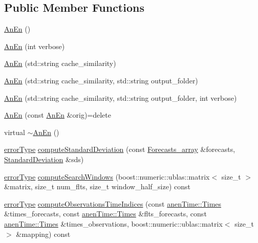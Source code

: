 \subsection*{Public Member Functions}
\begin{DoxyCompactItemize}
\item 
\mbox{\hyperlink{class_an_en_a60c12de232af95794a6194fbac06623a}{An\+En}} ()
\item 
\mbox{\hyperlink{class_an_en_a71a7c34cc125ce75e1377fd6f62988da}{An\+En}} (int verbose)
\item 
\mbox{\hyperlink{class_an_en_a02c78b9f5835a36a7a3e5c292c1d04fa}{An\+En}} (std\+::string cache\+\_\+similarity)
\item 
\mbox{\hyperlink{class_an_en_a00401d61d55408c3a8e23dbda0d7c512}{An\+En}} (std\+::string cache\+\_\+similarity, std\+::string output\+\_\+folder)
\item 
\mbox{\hyperlink{class_an_en_ab7fc3bc69d9f4639075f5700b1812b22}{An\+En}} (std\+::string cache\+\_\+similarity, std\+::string output\+\_\+folder, int verbose)
\item 
\mbox{\hyperlink{class_an_en_a97a51c40812584b01413a4426b1285a6}{An\+En}} (const \mbox{\hyperlink{class_an_en}{An\+En}} \&orig)=delete
\item 
virtual \mbox{\hyperlink{class_an_en_a18609907411058ee2c343727ab69bff4}{$\sim$\+An\+En}} ()
\item 
\mbox{\hyperlink{class_an_en_a0e256eb89d102d318a47d936b02242bf}{error\+Type}} \mbox{\hyperlink{class_an_en_a759e434ea7749b867900b783a1d02180}{compute\+Standard\+Deviation}} (const \mbox{\hyperlink{class_forecasts__array}{Forecasts\+\_\+array}} \&forecasts, \mbox{\hyperlink{class_standard_deviation}{Standard\+Deviation}} \&sds)
\item 
\mbox{\hyperlink{class_an_en_a0e256eb89d102d318a47d936b02242bf}{error\+Type}} \mbox{\hyperlink{class_an_en_ac8cfe2cbd23482c35da648a4caf402bd}{compute\+Search\+Windows}} (boost\+::numeric\+::ublas\+::matrix$<$ size\+\_\+t $>$ \&matrix, size\+\_\+t num\+\_\+flts, size\+\_\+t window\+\_\+half\+\_\+size) const
\item 
\mbox{\hyperlink{class_an_en_a0e256eb89d102d318a47d936b02242bf}{error\+Type}} \mbox{\hyperlink{class_an_en_a3aaabacd299648521c90d661dcbba300}{compute\+Observations\+Time\+Indices}} (const \mbox{\hyperlink{classanen_time_1_1_times}{anen\+Time\+::\+Times}} \&times\+\_\+forecasts, const \mbox{\hyperlink{classanen_time_1_1_times}{anen\+Time\+::\+Times}} \&flts\+\_\+forecasts, const \mbox{\hyperlink{classanen_time_1_1_times}{anen\+Time\+::\+Times}} \&times\+\_\+observations, boost\+::numeric\+::ublas\+::matrix$<$ size\+\_\+t $>$ \&mapping) const

\end{DoxyCompactItemize}

